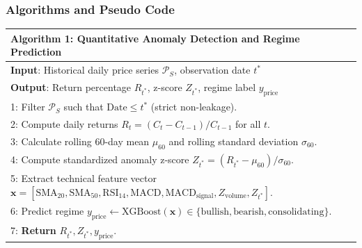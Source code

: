 \documentclass{article}
\begin{document}
	\subsubsection{Algorithms and Pseudo Code}

	\begin{center}
	\begin{tabular}{|p{}|}
	\hline
	\textbf{Algorithm 1: Quantitative Anomaly Detection and Regime Prediction} \\
	\hline
	\textbf{Input}: Historical daily price series $\mathcal{P}_S$, observation date $t^*$ \\
	\textbf{Output}: Return percentage $R_{t^*}$, z-score $Z_{t^*}$, regime label $y_{\text{price}}$ \\
	1: Filter $\mathcal{P}_S$ such that $\text{Date} \le t^*$ (strict non-leakage). \\
	2: Compute daily returns $R_t = (C_t - C_{t-1}) / C_{t-1}$ for all $t$. \\
	3: Calculate rolling 60-day mean $\mu_{60}$ and rolling standard deviation $\sigma_{60}$. \\
	4: Compute standardized anomaly z-score $Z_{t^*} = (R_{t^*} - \mu_{60}) / \sigma_{60}$. \\
	5: Extract technical feature vector $\mathbf{x} = [\text{SMA}_{20}, \text{SMA}_{50}, \text{RSI}_{14}, \text{MACD}, \text{MACD}_{\text{signal}}, Z_{\text{volume}}, Z_{t^*}]$. \\
	6: Predict regime $y_{\text{price}} \leftarrow \text{XGBoost}(\mathbf{x}) \in \{\text{bullish}, \text{bearish}, \text{consolidating}\}$. \\
	7: \textbf{Return} $R_{t^*}, Z_{t^*}, y_{\text{price}}$. \\
	\hline
	\end{tabular}
	\end{center}
\end{document}
